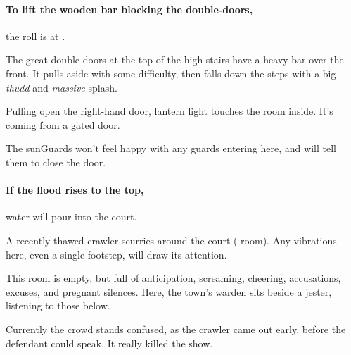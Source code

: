 \begin{multicols}{2}
\paragraph{To lift the wooden bar blocking the double-doors,}
the roll is  at \tn[7].

\begin{boxtext}
  The great double-doors at the top of the high stairs have a heavy bar over the front.
  It pulls aside with some difficulty, then falls down the steps with a big \emph{thudd} and \emph{massive} splash.

  Pulling open the right-hand door, lantern light touches the room inside.
  It's coming from a gated door.
\end{boxtext}

The \glspl{sunGuard} won't feel happy with any \glspl{guard} entering here, and will tell them to close the door.

\paragraph{If the flood rises to the top,}
water will pour into the \gls{court}.


A recently-thawed \gls{crawler} scurries around the \gls{court} ( room).
Any vibrations here, even a single footstep, will draw its attention.


\begin{exampletext}
  This room is empty, but full of anticipation, screaming, cheering, accusations, excuses, and pregnant silences.
  Here, the town's \gls{warden} sits beside a jester, listening to those below.
\end{exampletext}

Currently the crowd stands confused, as the \gls{crawler} came out early, before the defendant could speak.
It really killed the show.

\chitincrawler

\end{multicols}

